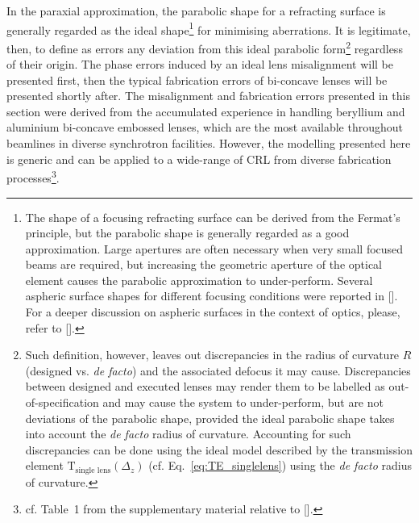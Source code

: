 \begin{refsection}
In the paraxial approximation, the parabolic shape for a refracting surface is generally regarded as the ideal shape\footnote{The shape of a focusing refracting surface can be derived from the Fermat's principle, but the parabolic shape is generally regarded as a good approximation. Large apertures are often necessary when very small focused beams are required, but increasing the geometric aperture of the optical element causes the parabolic approximation to under-perform. Several aspheric surface shapes for different focusing conditions were reported in [\cite[Fig~4]{SanchezdelRio2012}]. For a deeper discussion on aspheric surfaces in the context of optics, please, refer to [\cite{Schulz1988}].} for minimising aberrations. It is legitimate, then, to define as errors any deviation from this ideal parabolic form\footnote{Such definition, however, leaves out discrepancies in the radius of curvature $R$ (designed vs. \textit{de facto}) and the associated defocus it may cause. Discrepancies between designed and executed lenses may render them to be labelled as out-of-specification and may cause the system to under-perform, but are not deviations of the parabolic shape, provided the ideal parabolic shape takes into account the \textit{de facto} radius of curvature. Accounting for such discrepancies can be done using the ideal model described by the transmission element $\mathrm{T}_{\text{single lens}}(\Delta_z)$ (cf. Eq.~\ref{eq:TE_singlelens}) using the \textit{de facto} radius of curvature.} regardless of their origin. The phase errors induced by an ideal lens misalignment will be presented first, then the typical fabrication errors of bi-concave lenses will be presented shortly after. The misalignment and fabrication errors presented in this section were derived from the accumulated experience in handling beryllium and aluminium bi-concave embossed lenses, which are the most available throughout beamlines in diverse synchrotron facilities. However, the modelling presented here is generic and can be applied to a wide-range of CRL from diverse fabrication processes\footnote{cf. Table~1 from the supplementary material relative to [\cite{Roth2017}].}.


\end{refsection}
